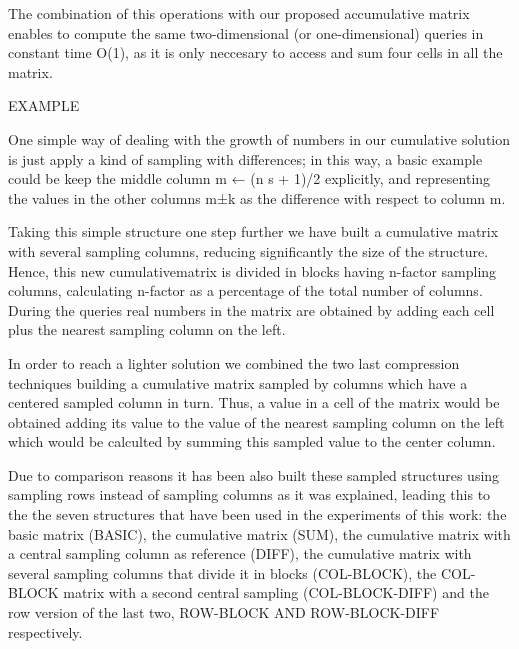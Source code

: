 \documentclass[runningheads]{llncs}
\begin{document}
The combination of this operations with our proposed accumulative matrix enables to compute the same two-dimensional (or one-dimensional) queries in constant time O(1), as it is only neccesary to access and sum four cells in all the matrix.

EXAMPLE

One simple way of dealing with the growth of numbers in our cumulative solution is just apply a kind of sampling with differences; in this way, a basic example could be keep the middle column m ← (n s + 1)/2 explicitly, and representing the values in the other columns m±k as the difference with respect to column m.



Taking this simple structure one step further we have built a cumulative matrix with several sampling columns, reducing significantly the size of the structure. Hence, this new cumulativematrix is divided in blocks having n-factor sampling columns, calculating n-factor as a percentage
of the total number of columns. During the queries real numbers in the matrix are obtained by adding each cell plus the nearest sampling column on the left.



In order to reach a lighter solution we combined the two last compression techniques building a cumulative matrix sampled by columns which have a centered sampled column in turn. Thus, a value in a cell of the matrix would be obtained adding its value to the value of the nearest sampling column on the left which would be calculted by summing this sampled value to the center column.



Due to comparison reasons it has been also built these sampled structures using sampling rows instead of sampling columns as it was explained, leading this to the the seven structures that have been used in the experiments of this work: the basic matrix (BASIC), the cumulative matrix (SUM), the cumulative matrix with a central sampling column as reference (DIFF), the cumulative matrix with several sampling columns that divide it in blocks (COL-BLOCK), the COL-BLOCK matrix with a second central sampling (COL-BLOCK-DIFF) and the row version of the last two, ROW-BLOCK AND ROW-BLOCK-DIFF respectively.
\end{document}
